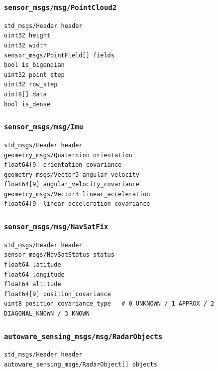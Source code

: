 \documentclass[
]{article}
\begin{document}
\subsubsection{\texorpdfstring{\texttt{sensor\_msgs/msg/PointCloud2}}{sensor\_msgs/msg/PointCloud2}}\label{sensor_msgsmsgpointcloud2}

\begin{verbatim}
std_msgs/Header header
uint32 height
uint32 width
sensor_msgs/PointField[] fields
bool is_bigendian
uint32 point_step
uint32 row_step
uint8[] data
bool is_dense
\end{verbatim}

\subsubsection{\texorpdfstring{\texttt{sensor\_msgs/msg/Imu}}{sensor\_msgs/msg/Imu}}\label{sensor_msgsmsgimu}

\begin{verbatim}
std_msgs/Header header
geometry_msgs/Quaternion orientation
float64[9] orientation_covariance
geometry_msgs/Vector3 angular_velocity
float64[9] angular_velocity_covariance
geometry_msgs/Vector3 linear_acceleration
float64[9] linear_acceleration_covariance
\end{verbatim}

\subsubsection{\texorpdfstring{\texttt{sensor\_msgs/msg/NavSatFix}}{sensor\_msgs/msg/NavSatFix}}\label{sensor_msgsmsgnavsatfix}

\begin{verbatim}
std_msgs/Header header
sensor_msgs/NavSatStatus status
float64 latitude
float64 longitude
float64 altitude
float64[9] position_covariance
uint8 position_covariance_type   # 0 UNKNOWN / 1 APPROX / 2 DIAGONAL_KNOWN / 3 KNOWN
\end{verbatim}

\subsubsection{\texorpdfstring{\texttt{autoware\_sensing\_msgs/msg/RadarObjects}}{autoware\_sensing\_msgs/msg/RadarObjects}}\label{autoware_sensing_msgsmsgradarobjects}

\begin{verbatim}
std_msgs/Header header
autoware_sensing_msgs/RadarObject[] objects
\end{verbatim}
\end{document}
